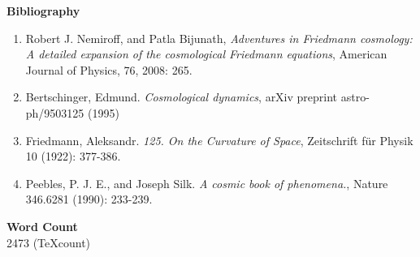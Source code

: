 \documentclass[12pt]{article} %
\begin{document}
 {\Large{ \bf{Bibliography}}}
 
 \begin{enumerate}
 \item Robert J. Nemiroff, and Patla Bijunath, {\em Adventures in Friedmann cosmology: A detailed expansion of the cosmological Friedmann equations}, American Journal of Physics, 76, 2008: 265.
 
 \item Bertschinger, Edmund. {\em Cosmological dynamics}, arXiv preprint astro-ph/9503125 (1995)
 
 \item Friedmann, Aleksandr. {\em 125. On the Curvature of Space}, Zeitschrift für Physik 10 (1922): 377-386.
 
 \item Peebles, P. J. E., and Joseph Silk. {\em A cosmic book of phenomena.}, Nature 346.6281 (1990): 233-239.
 \end{enumerate}
 

  
 {\Large{ \bf{Word Count}}}\\
 
 2473 (TeXcount)
\end{document}
